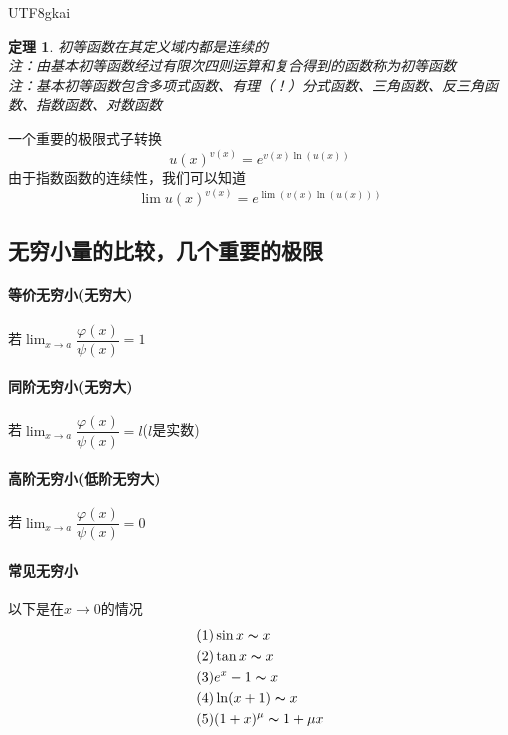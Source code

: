 \documentclass{article}
\newtheorem{theorem}{定理}[subsection]
\begin{document}
\begin{CJK}{UTF8}{gkai}
\begin{theorem}
初等函数在其定义域内都是连续的\\
注：由基本初等函数经过有限次四则运算和复合得到的函数称为初等函数\\
注：基本初等函数包含多项式函数、有理（！）分式函数、三角函数、反三角函数、指数函数、对数函数\\
\end{theorem}
一个重要的极限式子转换
\[u(x)^{v(x)}=e^{v(x)\ln(u(x))}\]
由于指数函数的连续性，我们可以知道
\[\lim u(x)^{v(x)}=e^{\lim(v(x)\ln(u(x)))}\]

\subsection{无穷小量的比较，几个重要的极限}

\paragraph{等价无穷小(无穷大)\\}
若$\lim_{x\to a}\dfrac{\varphi(x)}{\psi(x)}=1$\\

\paragraph{同阶无穷小(无穷大)\\}
若$\lim_{x\to a}\dfrac{\varphi(x)}{\psi(x)}=l$($l$是实数)\\
\paragraph{高阶无穷小(低阶无穷大)\\}

若$\lim_{x\to a}\dfrac{\varphi(x)}{\psi(x)}=0$\\

\paragraph{常见无穷小\\}
以下是在$x\to 0$的情况
\[
\begin{aligned}
&(1) \sin x\thicksim x\\
&(2) \tan x\thicksim x\\
&(3) e^x-1\thicksim x\\
&(4) \ln(x+1)\thicksim x\\
&(5) (1+x)^\mu\thicksim 1+\mu x\\
\end{aligned}
\]

\end{CJK}
\end{document}
